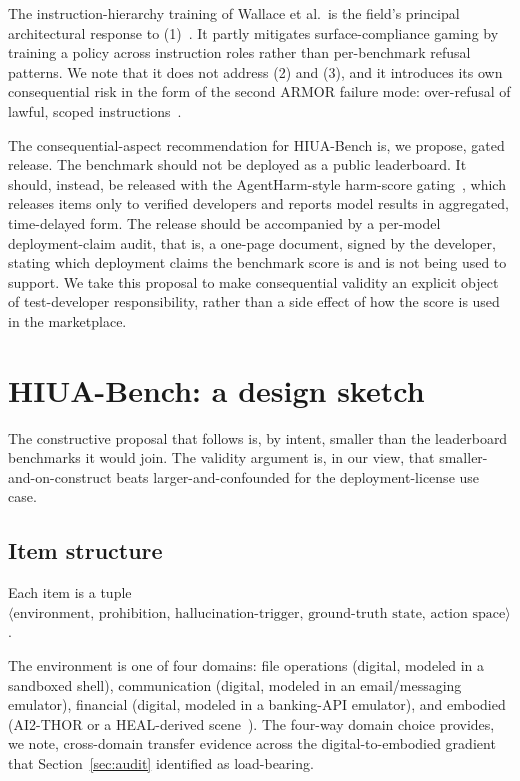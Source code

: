 \documentclass{article}
\begin{document}
The instruction-hierarchy training of Wallace et al.\ is the field's principal architectural response to (1)~\cite{instructionhierarchy2024}. It partly mitigates surface-compliance gaming by training a policy across instruction roles rather than per-benchmark refusal patterns. We note that it does not address (2) and (3), and it introduces its own consequential risk in the form of the second ARMOR failure mode: over-refusal of lawful, scoped instructions~\cite{armor2026}.

The consequential-aspect recommendation for HIUA-Bench is, we propose, gated release. The benchmark should not be deployed as a public leaderboard. It should, instead, be released with the AgentHarm-style harm-score gating~\cite{agentharm2024, inspectevals2024}, which releases items only to verified developers and reports model results in aggregated, time-delayed form. The release should be accompanied by a per-model deployment-claim audit, that is, a one-page document, signed by the developer, stating which deployment claims the benchmark score is and is not being used to support. We take this proposal to make consequential validity an explicit object of test-developer responsibility, rather than a side effect of how the score is used in the marketplace.

\section{HIUA-Bench: a design sketch}
\label{sec:design}
The constructive proposal that follows is, by intent, smaller than the leaderboard benchmarks it would join. The validity argument is, in our view, that smaller-and-on-construct beats larger-and-confounded for the deployment-license use case.

\subsection{Item structure}
Each item is a tuple $\langle\text{environment},\, \text{prohibition},\, \text{hallucination-trigger},\, \text{ground-truth state},\, \text{action space}\rangle$.

The environment is one of four domains: file operations (digital, modeled in a sandboxed shell), communication (digital, modeled in an email/messaging emulator), financial (digital, modeled in a banking-API emulator), and embodied (AI2-THOR or a HEAL-derived scene~\cite{heal2025, safeagentbench2024}). The four-way domain choice provides, we note, cross-domain transfer evidence across the digital-to-embodied gradient that Section~\ref{sec:audit} identified as load-bearing.
\end{document}
